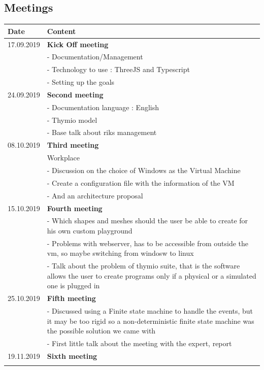 \documentclass{scrartcl}
\begin{document}
\subsection{Meetings}
\begin{tabular}{ | m{3cm} | m{10cm} | }
  \hline
  Date & Content \\
  \hline
  17.09.2019 & \textbf{Kick Off meeting}\\
  & - Documentation/Management\\
  & - Technology to use : ThreeJS and Typescript\\
  & - Setting up the goals\\
  \hline
  24.09.2019 & \textbf{Second meeting} \\
  & - Documentation language : English \\
  & - Thymio model \\
  & - Base talk about riks management \\
  \hline
  08.10.2019 & \textbf{Third meeting}\\
  & Workplace\\
  & - Discussion on the choice of Windows as the Virtual Machine \\
  & - Create a configuration file with the information of the VM \\
  & - And an architecture proposal \\
  \hline
  15.10.2019 & \textbf{Fourth meeting} \\
  & - Which shapes and meshes should the user be able to create for his own custom playground \\
  & - Problems with webserver, has to be accessible from outside the vm, so maybe switching from windosw to linux \\
  & - Talk about the problem of thymio suite, that is the software allows the user to create programs only if a physical or a simulated one is plugged in \\
  \hline
  25.10.2019 & \textbf{Fifth meeting} \\
  & - Discussed using a Finite state machine to handle the events, but it may be too rigid so a non-deterministic finite state machine was the possible solution we came with \\
  & - First little talk about the meeting with the expert, report\\
  \hline
  19.11.2019 & \textbf{Sixth meeting} \\
  & \\
  \hline
\end{tabular}
\end{document}
